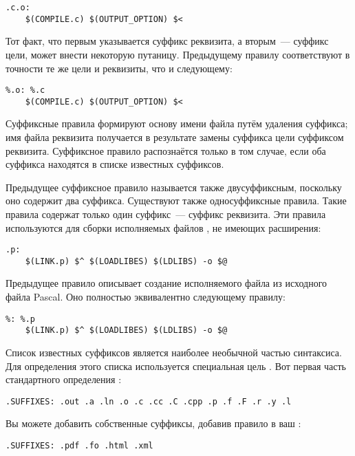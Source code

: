{\footnotesize
\begin{verbatim}
.c.o:
    $(COMPILE.c) $(OUTPUT_OPTION) $<
\end{verbatim}
}

Тот факт, что первым указывается суффикс реквизита, а вторым~---
суффикс цели, может внести некоторую путаницу. Предыдущему правилу
соответствуют в точности те же цели и реквизиты, что и следующему:

{\footnotesize
\begin{verbatim}
%.o: %.c
    $(COMPILE.c) $(OUTPUT_OPTION) $<
\end{verbatim}
}

Суффиксные правила формируют основу имени файла путём удаления
суффикса; имя файла реквизита получается в результате замены суффикса
цели суффиксом реквизита. Суффиксное правило распознаётся \GNUmake{}
только в том случае, если оба суффикса находятся в списке известных
суффиксов.

Предыдущее суффиксное правило называется также двусуффиксным,
поскольку оно содержит два суффикса. Существуют также односуффиксные
правила. Такие правила содержат только один суффикс~--- суффикс
реквизита. Эти правила используются для сборки исполняемых файлов
\UNIX{}, не имеющих расширения:

{\footnotesize
\begin{verbatim}
.p:
    $(LINK.p) $^ $(LOADLIBES) $(LDLIBS) -o $@
\end{verbatim}
}

Предыдущее правило описывает создание исполняемого файла из исходного
файла Pascal. Оно полностью эквивалентно следующему правилу:

{\footnotesize
\begin{verbatim}
%: %.p
    $(LINK.p) $^ $(LOADLIBES) $(LDLIBS) -o $@
\end{verbatim}
}

Список известных суффиксов является наиболее необычной частью
синтаксиса. Для определения этого списка используется специальная
цель . Вот первая часть стандартного определения
:

{\footnotesize
\begin{verbatim}
.SUFFIXES: .out .a .ln .o .c .cc .C .cpp .p .f .F .r .y .l
\end{verbatim}
}

Вы можете добавить собственные суффиксы, добавив правило
 в ваш \Makefile{}:

{\footnotesize
\begin{verbatim}
.SUFFIXES: .pdf .fo .html .xml
\end{verbatim}
}

